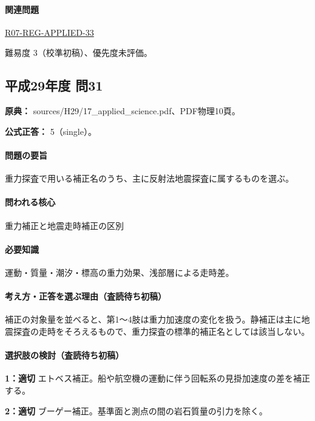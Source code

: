 \paragraph{関連問題} \hyperref[q:r07-reg-applied-33]{R07-REG-APPLIED-33}

\par 難易度 3（校準初稿）、優先度未評価。

\subsection{平成29年度 問31}
\label{q:h29-reg-applied-31}

\noindent\textbf{原典：} sources/H29/17\_applied\_science.pdf、PDF物理10頁。

\textbf{公式正答：} 5（single）。

\paragraph{問題の要旨} 重力探査で用いる補正名のうち、主に反射法地震探査に属するものを選ぶ。

\paragraph{問われる核心} 重力補正と地震走時補正の区別

\paragraph{必要知識} 運動・質量・潮汐・標高の重力効果、浅部層による走時差。

\paragraph{考え方・正答を選ぶ理由（査読待ち初稿）} 補正の対象量を並べると、第1〜4肢は重力加速度の変化を扱う。静補正は主に地震探査の走時をそろえるもので、重力探査の標準的補正名としては該当しない。

\paragraph{選択肢の検討（査読待ち初稿）}\mbox{}\par

\noindent\textbf{1：適切} エトベス補正。船や航空機の運動に伴う回転系の見掛加速度の差を補正する。\par

\noindent\textbf{2：適切} ブーゲー補正。基準面と測点の間の岩石質量の引力を除く。\par

